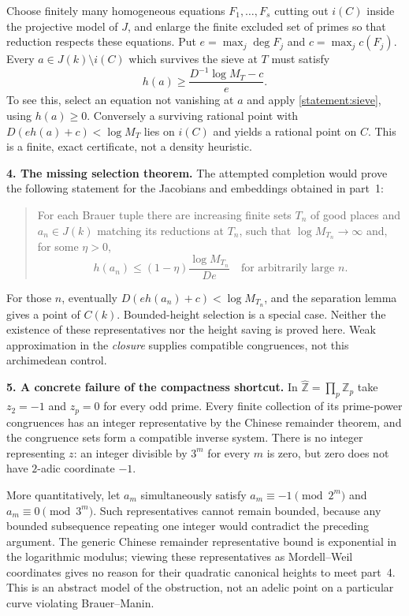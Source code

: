 \documentclass[11pt,a4paper]{article}
\newcommand{\Z}{\mathbb{Z}}
\begin{document}
Choose finitely many homogeneous equations $F_1,\ldots,F_s$ cutting out
$i(C)$ inside the projective model of $J$, and enlarge the finite excluded
set of primes so that reduction respects these equations. Put
$e=\max_j\deg F_j$ and $c=\max_jc(F_j)$. Every
$a\in J(k)\setminus i(C)$ which survives the sieve at $T$ must satisfy
\begin{equation}\label{statement:separation}
 h(a)\ge\frac{D^{-1}\log M_T-c}{e}.
\end{equation}
To see this, select an equation not vanishing at $a$ and apply
\eqref{statement:sieve}, using $h(a)\ge0$. Conversely a surviving rational point
with $D(eh(a)+c)<\log M_T$ lies on $i(C)$ and yields a rational point on
$C$. This is a finite, exact certificate, not a density heuristic.

\textbf{4. The missing selection theorem.}
The attempted completion would prove the following statement for the
Jacobians and embeddings obtained in part~1:
\begin{quote}\small
For each Brauer tuple there are increasing finite sets $T_n$ of good
places and $a_n\in J(k)$ matching its reductions at $T_n$, such that
$\log M_{T_n}\to\infty$ and, for some $\eta>0$,
\[
 h(a_n)\le(1-\eta)\frac{\log M_{T_n}}{De}
 \quad\text{for arbitrarily large }n.
\]
\end{quote}
For those $n$, eventually $D(eh(a_n)+c)<\log M_{T_n}$, and the separation
lemma gives a point of $C(k)$. Bounded-height selection is a special case.
Neither the existence of these representatives nor the height saving is
proved here. Weak approximation in the \emph{closure} supplies compatible
congruences, not this archimedean control.

\textbf{5. A concrete failure of the compactness shortcut.}
In $\widehat{\Z}=\prod_p\Z_p$ take $z_2=-1$ and $z_p=0$ for every odd prime.
Every finite collection of its prime-power congruences has an integer
representative by the Chinese remainder theorem, and the congruence sets
form a compatible inverse system. There is no integer representing $z$:
an integer divisible by $3^m$ for every $m$ is zero, but zero does not
have $2$-adic coordinate $-1$.

More quantitatively, let $a_m$ simultaneously satisfy
$a_m\equiv-1\pmod{2^m}$ and $a_m\equiv0\pmod{3^m}$. Such representatives
cannot remain bounded, because any bounded subsequence repeating one
integer would contradict the preceding argument. The generic Chinese
remainder representative bound is exponential in the logarithmic modulus;
viewing these representatives as Mordell--Weil coordinates gives no
reason for their quadratic canonical heights to meet part~4. This is an
abstract model of the obstruction, not an adelic point on a particular
curve violating Brauer--Manin.
\end{document}
